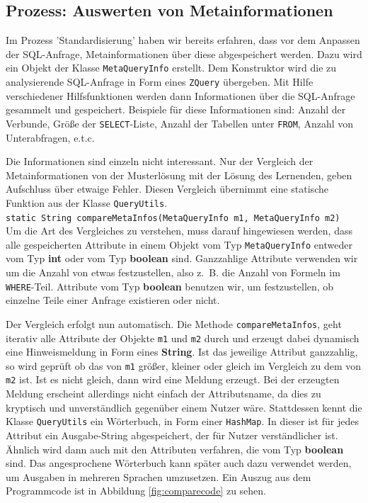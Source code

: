 \subsection*{Prozess: Auswerten von Metainformationen} 

Im Prozess 'Standardisierung' haben wir bereits erfahren, dass vor dem Anpassen der SQL-Anfrage, Metainformationen über diese abgespeichert werden. Dazu wird ein Objekt der Klasse \verb|MetaQueryInfo| erstellt. Dem Konstruktor wird die zu analysierende SQL-Anfrage in Form eines \verb|ZQuery| übergeben. Mit Hilfe verschiedener Hilfsfunktionen werden dann Informationen über die SQL-Anfrage gesammelt und gespeichert. Beispiele für diese Informationen sind: Anzahl der Verbunde, Größe der \verb|SELECT|-Liste, Anzahl der Tabellen unter \verb|FROM|, Anzahl von Unterabfragen, e.t.c. 

Die Informationen sind einzeln nicht interessant. Nur der Vergleich der Metainformationen von der Musterlösung mit der Lösung des Lernenden, geben Aufschluss über etwaige Fehler. Diesen Vergleich übernimmt eine statische Funktion aus der Klasse \verb|QueryUtils|.\\
\verb|static String compareMetaInfos(MetaQueryInfo m1, MetaQueryInfo m2)|\\
Um die Art des Vergleiches zu verstehen, muss darauf hingewiesen werden, dass alle gespeicherten Attribute in einem Objekt vom Typ \verb|MetaQueryInfo| entweder vom Typ \textbf{int} oder vom Typ \textbf{boolean} sind. Ganzzahlige Attribute verwenden wir um die Anzahl von etwas festzustellen, also \mbox{z. B.} die Anzahl von Formeln im \verb|WHERE|-Teil. Attribute vom Typ \textbf{boolean} benutzen wir, um festzustellen, ob einzelne Teile einer Anfrage existieren oder nicht.

Der Vergleich erfolgt nun automatisch. Die Methode \verb|compareMetaInfos|, geht iterativ alle Attribute der Objekte \verb|m1| und \verb|m2| durch und erzeugt dabei dynamisch eine Hinweismeldung in Form eines \textbf{String}. Ist das jeweilige Attribut ganzzahlig, so wird geprüft ob das von \verb|m1| größer, kleiner oder gleich im Vergleich zu dem von \verb|m2| ist. Ist es nicht gleich, dann wird eine Meldung erzeugt. Bei der erzeugten Meldung erscheint allerdings nicht einfach der Attributsname, da dies zu kryptisch und unverständlich gegenüber einem Nutzer wäre. Stattdessen kennt die Klasse \verb|QueryUtils| ein Wörterbuch, in Form einer \verb|HashMap|. In dieser ist für jedes Attribut ein Ausgabe-String abgespeichert, der für Nutzer verständlicher ist. Ähnlich wird dann auch mit den Attributen verfahren, die vom Typ \textbf{boolean} sind. Das angesprochene Wörterbuch kann später auch dazu verwendet werden, um Ausgaben in mehreren Sprachen umzusetzen.
Ein Auszug aus dem Programmcode ist in Abbildung \ref{fig:comparecode} zu sehen.

